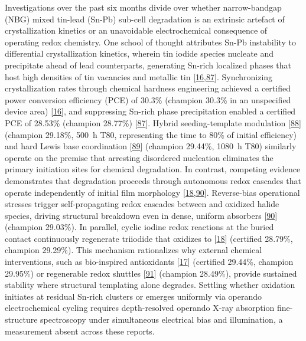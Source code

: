 \documentclass[
  11pt,
]{article}
\begin{document}
Investigations over the past six months divide over whether
narrow-bandgap (NBG) mixed tin-lead (Sn-Pb) sub-cell degradation is an
extrinsic artefact of crystallization kinetics or an unavoidable
electrochemical consequence of operating redox chemistry. One school of
thought attributes Sn-Pb instability to differential crystallization
kinetics, wherein tin iodide species nucleate and precipitate ahead of
lead counterparts, generating Sn-rich localized phases that host high
densities of tin vacancies and metallic tin
{[}\href{https://doi.org/10.1038/s41565-026-02165-6}{16},\href{https://doi.org/10.1021/acsenergylett.6c00617}{87}{]}.
Synchronizing crystallization rates through chemical hardness
engineering achieved a certified power conversion efficiency (PCE) of
30.3\% (champion 30.3\% in an unspecified device area)
{[}\href{https://doi.org/10.1038/s41565-026-02165-6}{16}{]}, and
suppressing Sn-rich phase precipitation enabled a certified PCE of
28.53\% (champion 28.77\%)
{[}\href{https://doi.org/10.1021/acsenergylett.6c00617}{87}{]}. Hybrid
seeding-template modulation
{[}\href{https://doi.org/10.1002/anie.5595275}{88}{]} (champion 29.18\%,
\qty{500}{\hour} T80, representing the time to 80\% of initial
efficiency) and hard Lewis base coordination
{[}\href{https://doi.org/10.1002/adma.73682}{89}{]} (champion 29.44\%,
\qty{1080}{\hour} T80) similarly operate on the premise that arresting
disordered nucleation eliminates the primary initiation sites for
chemical degradation. In contrast, competing evidence demonstrates that
degradation proceeds through autonomous redox cascades that operate
independently of initial film morphology
{[}\href{https://doi.org/10.1002/anie.4918900}{18},\href{https://doi.org/10.1002/adma.202522942}{90}{]}.
Reverse-bias operational stresses trigger self-propagating redox
cascades between  and oxidized halide species, driving
structural breakdown even in dense, uniform absorbers
{[}\href{https://doi.org/10.1002/adma.202522942}{90}{]} (champion
29.03\%). In parallel, cyclic iodine redox reactions at the buried
contact continuously regenerate triiodide that oxidizes  to
 {[}\href{https://doi.org/10.1002/anie.4918900}{18}{]}
(certified 28.79\%, champion 29.29\%). This mechanism rationalizes why
external chemical interventions, such as bio-inspired antioxidants
{[}\href{https://doi.org/10.1038/s41467-026-73210-0}{17}{]} (certified
29.44\%, champion 29.95\%) or regenerable redox shuttles
{[}\href{https://doi.org/10.1007/s40820-025-02006-6}{91}{]} (champion
28.49\%), provide sustained stability where structural templating alone
degrades. Settling whether  oxidation initiates at residual
Sn-rich clusters or emerges uniformly via operando electrochemical
cycling requires depth-resolved operando X-ray absorption fine-structure
spectroscopy under simultaneous electrical bias and illumination, a
measurement absent across these reports.
\end{document}
